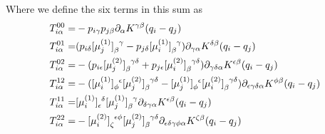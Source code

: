 \documentclass[12pt]{amsart}
\begin{document}
Where we define the six terms in this sum as
\begin{align*}
  T^{00}_{i\alpha} =& -p_{i\gamma}
  p_{j\beta} \partial_{\alpha}K^{\gamma\beta}(q_i - q_j) \\
  T^{01}_{i\alpha} =& (p_{i\delta} [\mu_j^{(1)}]\indices{_\beta^\gamma} -
  p_{j\delta}[\mu_i^{(1)}]\indices{_\beta^\gamma}) \partial_{\gamma\alpha}K^{\delta\beta}(q_i
  - q_j) \\
  T^{02}_{i\alpha} =& - (p_{i\epsilon}
  [\mu_j^{(2)}]\indices{_\beta^{\gamma\delta}} + p_{j\epsilon}
  [\mu_i^{(2)}] \indices{_\beta^{\gamma\delta}}
  ) \partial_{\gamma\delta\alpha}K^{\epsilon\beta}(q_i - q_j) \\
  T^{12}_{i\alpha} =& -([\mu_i^{(1)}] \indices{_\phi^\epsilon}
  [\mu_j^{(2)}]\indices{_\beta^{\gamma\delta}} -
  [\mu_j^{(1)}]\indices{_\phi^\epsilon} [\mu_i^{(2)}]
  \indices{_\beta^{\gamma\delta}}) \partial_{\epsilon\gamma\delta\alpha}K^{\phi\beta}(q_i
  - q_j) \\
  T^{11}_{i\alpha} =& [\mu_i^{(1)}] \indices{_\epsilon^\delta}
  [\mu_j^{(1)}]\indices{_\beta^\gamma} \partial_{\delta\gamma\alpha}
  K^{\epsilon\beta}(q_i - q_j) \\
  T^{22}_{i\alpha} =& -[\mu_i^{(2)}]\indices{_\zeta^{\epsilon\phi}}
  [\mu_j^{(2)}]\indices{_\beta^{\gamma\delta}} \partial_{\epsilon\delta\gamma\phi\alpha}
  K^{\zeta\beta}(q_i - q_j)
\end{align*}
\end{document}
